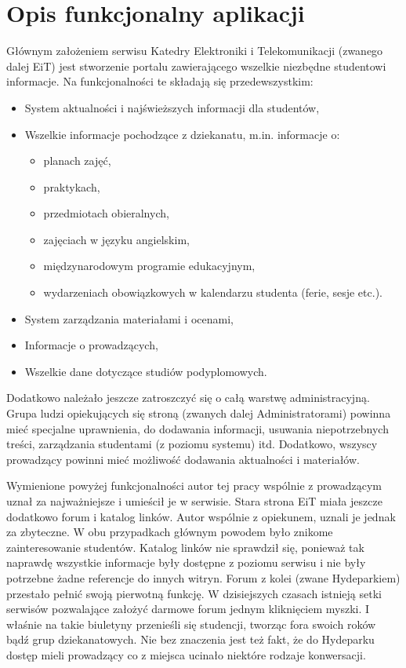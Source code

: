 \documentclass[a4paper,12pt,oneside]{report}
\begin{document}
\section{Opis funkcjonalny aplikacji}
\label{sec:funkcjonalny}
Głównym założeniem serwisu Katedry Elektroniki i Telekomunikacji (zwanego dalej EiT) jest stworzenie portalu zawierającego wszelkie niezbędne studentowi informacje. Na funkcjonalności te składają się przedewszystkim:
\begin{itemize}
  \item System aktualności i najświeższych informacji dla studentów,
  \item Wszelkie informacje pochodzące z dziekanatu, m.in. informacje o:
  \begin{itemize}
    \item planach zajęć,
    \item praktykach,
    \item przedmiotach obieralnych,
    \item zajęciach w języku angielskim,
    \item międzynarodowym programie edukacyjnym,
    \item wydarzeniach obowiązkowych w kalendarzu studenta (ferie, sesje etc.).
  \end{itemize}
  \item System zarządzania materiałami i ocenami,
  \item Informacje o prowadzących,
  \item Wszelkie dane dotyczące studiów podyplomowych.
\end{itemize}
Dodatkowo należało jeszcze zatroszczyć się o całą warstwę administracyjną. Grupa ludzi opiekujących się stroną (zwanych dalej Administratorami) powinna mieć specjalne uprawnienia, do dodawania informacji, usuwania niepotrzebnych treści, zarządzania studentami (z poziomu systemu) itd. Dodatkowo, wszyscy prowadzący powinni mieć możliwość dodawania aktualności i materiałów. 

Wymienione powyżej funkcjonalności autor tej pracy wspólnie z prowadzącym uznał za najważniejsze i umieścił je w serwisie. Stara strona EiT miała jeszcze dodatkowo forum i katalog linków. Autor wspólnie z opiekunem, uznali je jednak za zbyteczne. W obu przypadkach głównym powodem było znikome zainteresowanie studentów. Katalog linków nie sprawdził się, ponieważ tak naprawdę wszystkie informacje były dostępne z poziomu serwisu i nie były potrzebne żadne referencje do innych witryn. Forum z kolei (zwane Hydeparkiem) przestało pełnić swoją pierwotną funkcję. W dzisiejszych czasach istnieją setki serwisów pozwalające założyć darmowe forum jednym kliknięciem myszki. I właśnie na takie biuletyny przenieśli się studencji, tworząc fora swoich roków bądź grup dziekanatowych. Nie bez znaczenia jest też fakt, że do Hydeparku dostęp mieli prowadzący co z miejsca ucinało niektóre rodzaje konwersacji.
\end{document}
